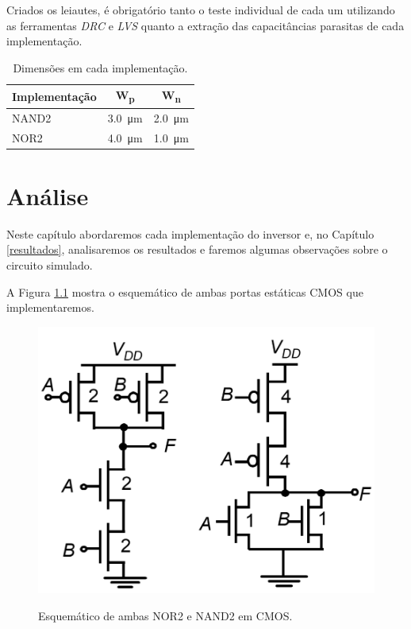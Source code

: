 \documentclass{iiufrgs}
\begin{document}
Criados os leiautes, é obrigatório tanto o teste individual de cada um utilizando as ferramentas \textit{DRC} e \textit{LVS} quanto a extração das capacitâncias parasitas de cada implementação.

\begin{table}[ht]
    \centering
    \caption{Dimensões em cada implementação.}
    \label{tab:imp}
    \begin{tabular}{l c c}
        \hline
        Implementação
        & W\textsubscript{p}
        & W\textsubscript{n} \\ \hline
        NAND2 & \SI{3.0}{\um}   & \SI{2.0}{\um}     \\ 
        NOR2 & \SI{4.0}{\um}    & \SI{1.0}{\um}     \\ \hline
    \end{tabular}
\end{table}

\chapter{Análise}\label{analise}
Neste capítulo abordaremos cada implementação do inversor e, no Capítulo \ref{resultados}, analisaremos os resultados e faremos algumas observações sobre o circuito simulado.

A Figura \ref{fig:both} mostra o esquemático de ambas portas estáticas CMOS que implementaremos.

\begin{figure}[htbp]
    \centering
    \caption{Esquemático de ambas NOR2 e NAND2 em CMOS.}
    \includegraphics[scale=0.6]{images/schem_both.png}
    \label{fig:both}
\end{figure}
\end{document}
